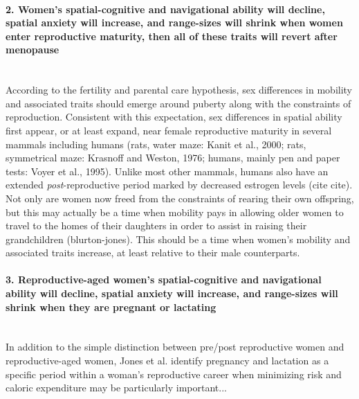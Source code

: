 \paragraph{2.  Women's spatial-cognitive and navigational ability will decline, spatial anxiety will increase, and range-sizes will shrink when women enter reproductive maturity, then all of these traits will revert after menopause}\mbox{}\\

According to the fertility and parental care hypothesis, sex differences in mobility and associated traits should emerge around puberty along with the constraints of reproduction.  Consistent with this expectation, sex differences in spatial ability first appear, or at least expand, near female reproductive maturity in several mammals including humans (rats, water maze: Kanit et al., 2000; rats, symmetrical maze: Krasnoff and Weston, 1976; humans, mainly pen and paper tests: Voyer et al., 1995).  Unlike most other mammals, humans also have an extended \emph{post}-reproductive period marked by decreased estrogen levels (cite cite).  Not only are women now freed from the constraints of rearing their own offspring, but this may actually be a time when mobility pays in allowing older women to travel to the homes of their daughters in order to assist in raising their grandchildren (blurton-jones).  This should be a time when women's mobility and associated traits increase, at least relative to their male counterparts.

\paragraph{3.  Reproductive-aged women's spatial-cognitive and navigational ability will decline, spatial anxiety will increase, and range-sizes will shrink when they are pregnant or lactating}\mbox{}\\

In addition to the simple distinction between pre/post reproductive women and reproductive-aged women, Jones et al. \cite{jones2003evolution} identify pregnancy and lactation as a specific period within a woman's reproductive career when minimizing risk and caloric expenditure may be particularly important...


